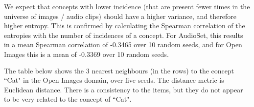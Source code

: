 We expect that concepts with lower incidence (that are present fewer times in the universe of images / audio clips) should have a higher variance, and therefore higher entropy. This is confirmed by calculating the Spearman correlation of the entropies with the number of incidences of a concept. For AudioSet, this results in a mean Spearman correlation of -0.3465 over 10 random seeds, and for Open Images this is a mean of -0.3369 over 10 random seeds. 


%





The table below shows the 3 nearest neighbours (in the rows) to the concept ``Cat" in the Open Images domain, over five seeds. The distance metric is Euclidean distance. There is a consistency to the items, but they do not appear to be very related to the concept of ``Cat".  

